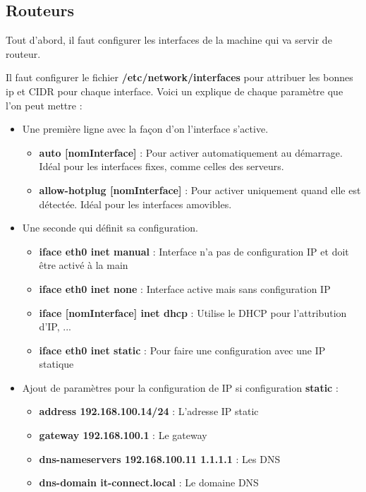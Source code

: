 \documentclass{article}
\begin{document}
\subsection{Routeurs}
Tout d'abord, il faut configurer les interfaces de la machine qui va servir de routeur.

Il faut configurer le fichier \textbf{/etc/network/interfaces} pour attribuer les bonnes ip et CIDR pour chaque interface. Voici un explique de chaque paramètre que l’on peut mettre :

\newpage

\begin{itemize}
    \item Une première ligne avec la façon d’on l’interface s’active.
    \begin{itemize}
        \item \textbf{auto [nomInterface]} : Pour activer automatiquement au démarrage. Idéal pour les interfaces fixes, comme celles des serveurs.
        \item \textbf{allow-hotplug [nomInterface]} : Pour activer uniquement quand elle est détectée. Idéal pour les interfaces amovibles.
    \end{itemize}
    \item Une seconde qui définit sa configuration.
    \begin{itemize}
        \item \textbf{iface eth0 inet manual} : Interface n'a pas de configuration IP et doit être activé à la main
        \item \textbf{iface eth0 inet none} : Interface active mais sans configuration IP
        \item \textbf{iface [nomInterface] inet dhcp} : Utilise le DHCP pour l'attribution d'IP, ...
        \item \textbf{iface eth0 inet static} : Pour faire une configuration avec une IP statique
    \end{itemize}
    \item Ajout de paramètres pour la configuration de IP si configuration \textbf{static} :
    \begin{itemize}
        \item \textbf{address 192.168.100.14/24} : L'adresse IP static
        \item \textbf{gateway 192.168.100.1} : Le gateway
        \item \textbf{dns-nameservers 192.168.100.11 1.1.1.1} : Les DNS
        \item \textbf{dns-domain it-connect.local} : Le domaine DNS

\end{itemize}
\end{itemize}
\end{document}
